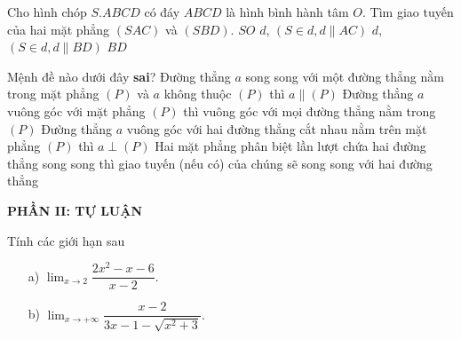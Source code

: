 \begin{ex}%
	Cho hình chóp $S.ABCD$ có đáy $ABCD$ là hình bình hành tâm $O$. Tìm giao tuyến của hai mặt phẳng $(SAC)$ và $(SBD)$.
	\choice
	{\True $SO$}
	{$d$, $(S \in d, d \parallel AC)$}
	{$d$, $(S \in d, d \parallel BD)$}
	{$BD$}
\end{ex}

\begin{ex}%
	Mệnh đề nào dưới đây \textbf{sai}?
	\choice
	{Đường thẳng $a$ song song với một đường thẳng nằm trong mặt phẳng $(P)$ và $a$ không thuộc $(P)$ thì $a \parallel  (P)$}
	{Đường thẳng $a$ vuông góc với mặt phẳng $(P)$ thì vuông góc với mọi đường thẳng nằm trong $(P)$}
	{Đường thẳng $a$ vuông góc với hai đường thẳng cắt nhau nằm trên mặt phẳng $(P)$ thì $a \perp (P)$}
	{\True Hai mặt phẳng phân biệt lần lượt chứa hai đường thẳng song song thì giao tuyến (nếu có) của chúng sẽ song song với hai đường thẳng}
\end{ex}
\noindent
\textbf{PHẦN II: TỰ LUẬN}
\begin{bt}%
	Tính các giới hạn sau
	\begin{enumerate}
		\item[a)]  $\displaystyle \lim_{x \to 2} \dfrac{2x^2-x-6}{x-2}.$
		\item[b)] $\displaystyle \lim_{x \to +\infty} \dfrac{x-2}{3x-1-\sqrt{x^2+3}}.$
	\end{enumerate}
\end{bt}

